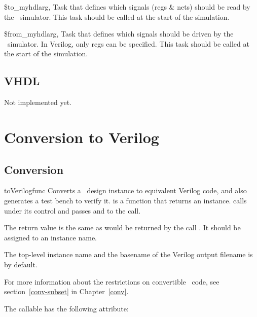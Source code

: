 \begin{funcdesc}{\$to_myhdl}{arg, }
Task that defines which signals (regs \& nets) should be
read by the \myhdl\ simulator.
This task should be called at the start of the simulation.
\end{funcdesc}

\begin{funcdesc}{\$from_myhdl}{arg, }
Task that defines which signals should be
driven by the \myhdl\ simulator. In Verilog, only regs
can be specified.
This task should be called at the start of the simulation.
\end{funcdesc}


\subsection{VHDL \label{ref-cosim-vhdl}}

Not implemented yet.

\section{Conversion to Verilog\label{ref-conv}}

\subsection{Conversion \label{ref-conv-conv}}

\begin{funcdesc}{toVerilog}{func  }
Converts a \myhdl\ design instance to equivalent Verilog
code, and also generates a test bench to verify it.
 is a function that returns an instance.
 calls  under its control
and passes  and  to the call.

The return value is the same as would be returned by the call
. It should be assigned
to an instance name.

The top-level instance name and the basename of the Verilog output
filename is  by default.

For more information about the restrictions on convertible
\myhdl\ code, see section~\ref{conv-subset} in
Chapter~\ref{conv}.
\end{funcdesc}

The  callable has the following attribute:

